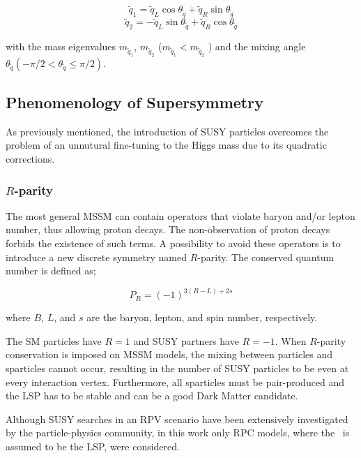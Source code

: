 				$$ \tilde{q}_1 = \tilde{q}_L \cos \theta_{\tilde{q}} + \tilde{q}_R \sin \theta_{\tilde{q}} $$
				$$ \tilde{q}_2 = - \tilde{q}_L \sin \theta_{\tilde{q}} + \tilde{q}_R \cos \theta_{\tilde{q}} $$
				
				\noindent with the mass eigenvalues $m_{\tilde{q}_1}$, $m_{\tilde{q}_2}$ ($m_{\tilde{q}_1} < m_{\tilde{q}_2}$ ) and the mixing angle $\theta_{\tilde{q}} \left (- \pi / 2 < \theta_{\tilde{q}} \leq \pi / 2 \right )$. 




		\subsection{Phenomenology of Supersymmetry}
		\label{sec:SUSYPheno}

			As previously mentioned, the introduction of \ac{SUSY} particles overcomes the problem of an unnutural fine-tuning to the Higgs mass due to its quadratic corrections.%

			\subsubsection*{$R$-parity}
				
				The most general \ac{MSSM} can contain operators that violate baryon and/or lepton number, thus allowing proton decays. The non-observation of proton decays forbids the existence of such terms. A possibility to avoid these operators is to introduce a new discrete symmetry named $R$-parity. The conserved quantum number is defined as;

				\begin{equation}
					P_R = \left ( -1 \right )^{3 \left (B - L \right )+ 2s}
				\end{equation}

				\noindent where $B$, $L$, and $s$ are the baryon, lepton, and spin number, respectively.	

				The \ac{SM} particles have $R = 1$ and \ac{SUSY} partners have $R=-1$. When $R$-parity conservation is imposed on \ac{MSSM} models, the mixing between particles and sparticles cannot occur, resulting in the number of \ac{SUSY} particles to be even at every interaction vertex. Furthermore, all sparticles must be pair-produced and the \ac{LSP} has to be stable and can be a good Dark Matter candidate. %

				Although \ac{SUSY} searches in an \ac{RPV} scenario have been extensively investigated by the particle-physics community, in this work only \ac{RPC} models, where the \ninoone\ is assumed to be the \ac{LSP}, were considered.


